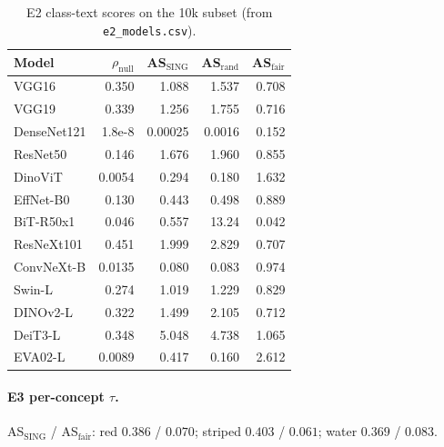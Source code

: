\documentclass[10pt,twocolumn]{article}
\begin{document}
\begin{table}[h]
\centering
\scriptsize
\setlength{\tabcolsep}{2.5pt}
\begin{tabular}{@{}lrrrr@{}}
\toprule
Model & $\rho_{\mathrm{null}}$ & AS$_{\mathrm{SING}}$ & AS$_{\mathrm{rand}}$ & AS$_{\mathrm{fair}}$ \\
\midrule
VGG16       & 0.350 & 1.088 & 1.537 & 0.708 \\
VGG19       & 0.339 & 1.256 & 1.755 & 0.716 \\
DenseNet121 & 1.8e-8 & 0.00025 & 0.0016 & 0.152 \\
ResNet50    & 0.146 & 1.676 & 1.960 & 0.855 \\
DinoViT     & 0.0054 & 0.294 & 0.180 & 1.632 \\
EffNet-B0   & 0.130 & 0.443 & 0.498 & 0.889 \\
BiT-R50x1   & 0.046 & 0.557 & 13.24 & 0.042 \\
ResNeXt101  & 0.451 & 1.999 & 2.829 & 0.707 \\
ConvNeXt-B  & 0.0135 & 0.080 & 0.083 & 0.974 \\
Swin-L      & 0.274 & 1.019 & 1.229 & 0.829 \\
DINOv2-L    & 0.322 & 1.499 & 2.105 & 0.712 \\
DeiT3-L     & 0.348 & 5.048 & 4.738 & 1.065 \\
EVA02-L     & 0.0089 & 0.417 & 0.160 & 2.612 \\
\bottomrule
\end{tabular}
\vspace{-0.3em}
\caption{E2 class-text scores on the 10k subset (from \texttt{e2\_models.csv}).}
\label{tab:e2models}
\end{table}

\paragraph{E3 per-concept $\tau$.}
AS$_{\mathrm{SING}}$ / AS$_{\mathrm{fair}}$:
red $0.386$ / $0.070$;
striped $0.403$ / $0.061$;
water $0.369$ / $0.083$.
\end{document}
